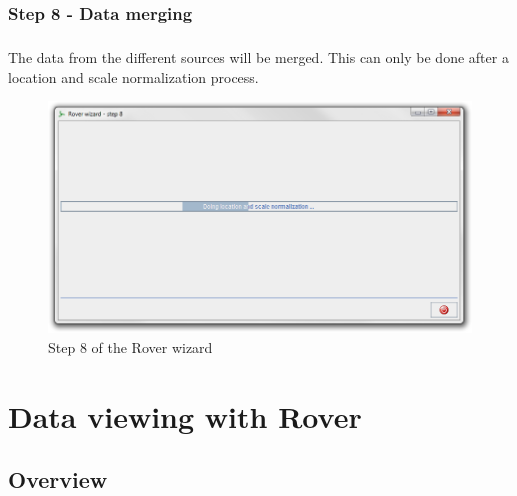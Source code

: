 \documentclass[11pt,a4paper,oneside,notitlepage]{book}
\begin{document}
\subsection{Step 8 - Data merging}
\paragraph{}The data from the different sources will be merged. This can only be done after a location and scale normalization process.  

\begin{figure}[H]
\begin{center}
\includegraphics[scale=0.4]{Rover_wizard_-_step_8.png}
\caption{Step 8 of the Rover wizard}
\label{step8}
\end{center}
\end{figure}


\chapter{Data viewing with Rover} \label{dataViewing}
\section{Overview}
\end{document}
